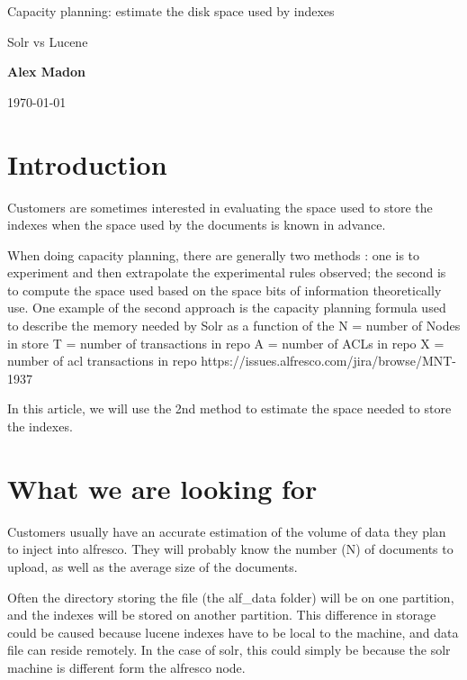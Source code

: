 \documentclass[12pt,a4]{article}
\begin{document}
\begin{center}
{\Large Capacity planning: estimate the disk space used by indexes}

\vspace{5mm}

\Large{Solr vs Lucene}

\vspace{5mm}
{\bf Alex Madon}
\vspace{5mm}

\today

\vspace{15mm}

\end{center}
\vspace{5mm}

\newpage

\tableofcontents

\newpage

\section{Introduction}
Customers are sometimes interested in evaluating the space used to store the indexes when the space used by the documents is known in advance.

When doing capacity planning, there are generally two methods\cite{allspaw}
: one is to experiment and then extrapolate the experimental rules observed; the second is to compute the space used based on the space bits of information theoretically use. One example of the second approach is the capacity planning formula used to describe the memory needed by Solr as a function of the N = number of Nodes in store
T = number of transactions in repo
A = number of ACLs in repo
X = number of acl transactions in repo
https://issues.alfresco.com/jira/browse/MNT-1937

In this article, we will use the 2nd method to estimate the space needed to store the indexes.



\section{What we are looking for}
Customers usually have an accurate estimation of the volume of data they plan to inject into alfresco.
They will probably know the number (N) of documents to upload, as well as the average size of the documents.

Often the directory storing the file (the alf\_data folder) will be on one partition, and the indexes will be stored on another partition. This difference in storage could be caused because lucene indexes have to be local to the machine, and data file can reside remotely. In the case of solr, this could simply be because the solr machine is different form the alfresco node.
\end{document}
